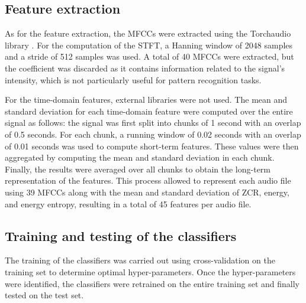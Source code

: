 \documentclass[journal]{IEEEtran}
\begin{document}
\subsection{Feature extraction}
As for the feature extraction, the MFCCs were extracted using the Torchaudio library \cite{hwang2023torchaudio, yang2021torchaudio}. For the computation of the STFT, a Hanning window of 2048 samples and a stride of 512 samples was used. A total of 40 MFCCs were extracted, but the  coefficient was discarded as it contains information related to the signal's intensity, which is not particularly useful for pattern recognition tasks.

For the time-domain features, external libraries were not used. The mean and standard deviation for each time-domain feature were computed over the entire signal as follows: the signal was first split into chunks of 1 second with an overlap of 0.5 seconds. For each chunk, a running window of 0.02 seconds with an overlap of 0.01 seconds was used to compute short-term features. These values were then aggregated by computing the mean and standard deviation in each chunk. Finally, the results were averaged over all chunks to obtain the long-term representation of the features.
This process allowed to represent each audio file using 39 MFCCs along with the mean and standard deviation of ZCR, energy, and energy entropy, resulting in a total of 45 features per audio file.

\subsection{Training and testing of the classifiers}
The training of the classifiers was carried out using cross-validation on the training set to determine optimal hyper-parameters. Once the hyper-parameters were identified, the classifiers were retrained on the entire training set and finally tested on the test set.
\end{document}

